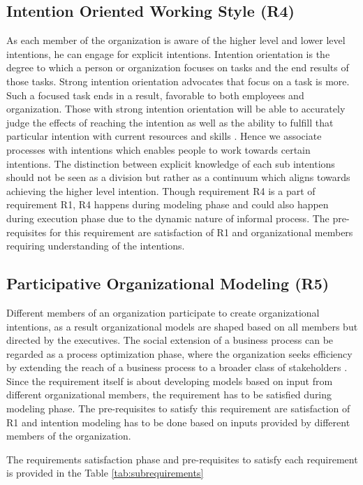 \subsection{Intention Oriented Working Style (R4)}
As each member of the organization is aware of the higher level and lower level intentions, he can engage for explicit intentions. Intention orientation is the degree to which a person or organization focuses on tasks and the end results of those tasks. Strong intention orientation advocates that focus on a task is more. Such a focused task ends in a result, favorable to both employees and organization. Those with strong intention orientation will be able to accurately judge the effects of reaching the intention as well as the ability to fulfill that particular intention with current resources and skills \cite{Lacom}. Hence we associate processes with intentions which enables people to work towards certain intentions. The distinction between explicit knowledge of each sub intentions should not be seen as a division but rather as a continuum which aligns towards achieving the higher level intention. Though requirement R4 is a part of requirement R1, R4 happens during modeling phase and could also happen during execution phase due to the dynamic nature of informal process. The pre-requisites for this requirement are satisfaction of R1 and organizational members requiring understanding of the intentions.  

\subsection{Participative Organizational Modeling (R5)}
 Different members of an organization participate to create organizational intentions, as a result organizational models are shaped based on all members but directed by the executives. The  social  extension  of  a  business  process  can  be  regarded  as  a  process optimization phase, where the organization seeks efficiency  by  extending  the  reach  of  a  business  process  to  a  broader  class  of  stakeholders \cite{Brambilla2012}. Since the requirement itself is about developing models based on input from different organizational members, the requirement has to be satisfied during modeling phase. The pre-requisites to satisfy this requirement are satisfaction of R1 and intention modeling has to be done based on inputs provided by different members of the organization.  
 
 The requirements satisfaction phase and pre-requisites to satisfy each requirement is provided in the Table \ref{tab:subrequirements}

